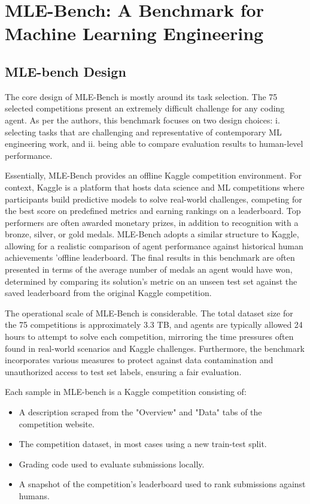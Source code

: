 \section{MLE-Bench: A Benchmark for Machine Learning Engineering}

\subsection{MLE-bench Design}
The core design of MLE-Bench is mostly around its task selection. The 75 selected competitions present an extremely difficult challenge for any coding agent. As per the authors, this benchmark focuses on two design choices: i. selecting tasks that are challenging and representative of contemporary ML engineering work, and ii. being able to compare evaluation results to human-level performance.

Essentially, MLE-Bench provides an offline Kaggle competition environment. For context, Kaggle is a platform that hosts data science and ML competitions where participants build predictive models to solve real-world challenges, competing for the best score on predefined metrics and earning rankings on a leaderboard. Top performers are often awarded monetary prizes, in addition to recognition with a bronze, silver, or gold medals. MLE-Bench adopts a similar structure to Kaggle, allowing for a realistic comparison of agent performance against historical human achievements 'offline leaderboard. The final results in this benchmark are often presented in terms of the average number of medals an agent would have won, determined by comparing its solution's metric on an unseen test set against the saved leaderboard from the original Kaggle competition.

The operational scale of MLE-Bench is considerable. The total dataset size for the 75 competitions is approximately 3.3 TB, and agents are typically allowed 24 hours to attempt to solve each competition, mirroring the time pressures often found in real-world scenarios and Kaggle challenges. Furthermore, the benchmark incorporates various measures to protect against data contamination and unauthorized access to test set labels, ensuring a fair evaluation.

Each sample in MLE-bench is a Kaggle competition consisting of:
\begin{itemize}
    \item A description scraped from the "Overview" and "Data" tabs of the competition website.
    \item The competition dataset, in most cases using a new train-test split.
    \item Grading code used to evaluate submissions locally.
    \item A snapshot of the competition's leaderboard used to rank submissions against humans.
\end{itemize}

